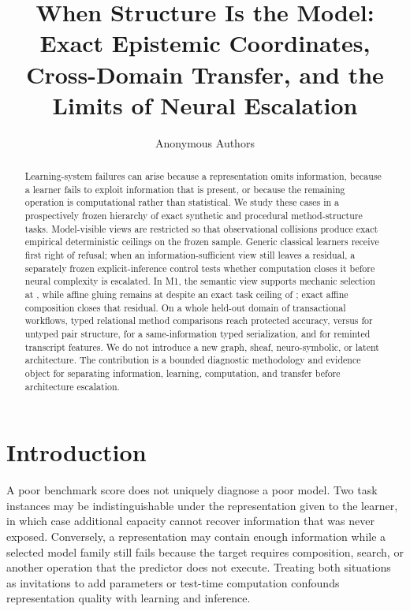 \documentclass[10pt]{article}
\title{When Structure Is the Model: Exact Epistemic Coordinates, Cross-Domain Transfer, and the Limits of Neural Escalation}
\author{Anonymous Authors}
\begin{document}
\maketitle

\begin{abstract}
Learning-system failures can arise because a representation omits information, because a learner fails to exploit information that is present, or because the remaining operation is computational rather than statistical. We study these cases in a prospectively frozen hierarchy of exact synthetic and procedural method-structure tasks. Model-visible views are restricted so that observational collisions produce exact empirical deterministic ceilings on the frozen sample. Generic classical learners receive first right of refusal; when an information-sufficient view still leaves a residual, a separately frozen explicit-inference control tests whether computation closes it before neural complexity is escalated. In M1, the semantic view supports mechanic selection at \MOneSemanticMechanicAccuracy, while affine gluing remains at \MOneSemanticGluingAccuracy despite an exact task ceiling of \MOneSemanticGluingCeiling; exact affine composition closes that residual. On a whole held-out domain of transactional workflows, typed relational method comparisons reach \DOneTypedAccuracy protected accuracy, versus \DOneUntypedAccuracy for untyped pair structure, \DOneSerializedAccuracy for a same-information typed serialization, and \DOneTranscriptAccuracy for reminted transcript features. We do not introduce a new graph, sheaf, neuro-symbolic, or latent architecture. The contribution is a bounded diagnostic methodology and evidence object for separating information, learning, computation, and transfer before architecture escalation.
\end{abstract}

\section{Introduction}

A poor benchmark score does not uniquely diagnose a poor model. Two task instances may be indistinguishable under the representation given to the learner, in which case additional capacity cannot recover information that was never exposed. Conversely, a representation may contain enough information while a selected model family still fails because the target requires composition, search, or another operation that the predictor does not execute. Treating both situations as invitations to add parameters or test-time computation confounds representation quality with learning and inference.
\end{document}
